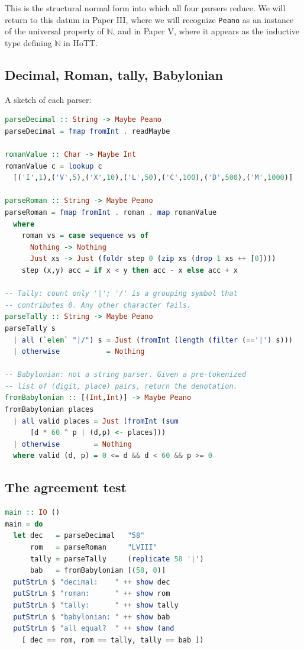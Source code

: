 \documentclass[12pt]{article}
\theoremstyle{definition}
\theoremstyle{remark}
\begin{document}
This is the structural normal form into which all four parsers reduce.
We will return to this datum in Paper III, where we will recognize
\texttt{Peano} as an instance of the universal property of $\mathbb{N}$,
and in Paper V, where it appears as the inductive type defining
$\mathbb{N}$ in HoTT.

\subsection{Decimal, Roman, tally, Babylonian}

A sketch of each parser:

\begin{lstlisting}[language=Haskell]
parseDecimal :: String -> Maybe Peano
parseDecimal = fmap fromInt . readMaybe

romanValue :: Char -> Maybe Int
romanValue c = lookup c
  [('I',1),('V',5),('X',10),('L',50),('C',100),('D',500),('M',1000)]

parseRoman :: String -> Maybe Peano
parseRoman = fmap fromInt . roman . map romanValue
  where
    roman vs = case sequence vs of
      Nothing -> Nothing
      Just xs -> Just (foldr step 0 (zip xs (drop 1 xs ++ [0])))
    step (x,y) acc = if x < y then acc - x else acc + x

-- Tally: count only '|'; '/' is a grouping symbol that
-- contributes 0. Any other character fails.
parseTally :: String -> Maybe Peano
parseTally s
  | all (`elem` "|/") s = Just (fromInt (length (filter (=='|') s)))
  | otherwise           = Nothing

-- Babylonian: not a string parser. Given a pre-tokenized
-- list of (digit, place) pairs, return the denotation.
fromBabylonian :: [(Int,Int)] -> Maybe Peano
fromBabylonian places
  | all valid places = Just (fromInt (sum
      [d * 60 ^ p | (d,p) <- places]))
  | otherwise        = Nothing
  where valid (d, p) = 0 <= d && d < 60 && p >= 0
\end{lstlisting}

\subsection{The agreement test}

\begin{lstlisting}[language=Haskell]
main :: IO ()
main = do
  let dec   = parseDecimal   "58"
      rom   = parseRoman     "LVIII"
      tally = parseTally     (replicate 58 '|')
      bab   = fromBabylonian [(58, 0)]
  putStrLn $ "decimal:    " ++ show dec
  putStrLn $ "roman:      " ++ show rom
  putStrLn $ "tally:      " ++ show tally
  putStrLn $ "babylonian: " ++ show bab
  putStrLn $ "all equal?  " ++ show (and
    [ dec == rom, rom == tally, tally == bab ])
\end{lstlisting}
\end{document}
